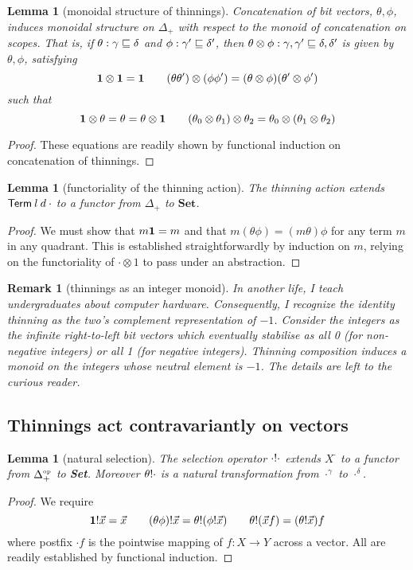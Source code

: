 \documentclass{jfp1}
\newtheorem{lemma}[theorem]{Lemma}
\newtheorem{remark}[theorem]{Remark}
\newcommand{\Set}{\textbf{Set}}
\newcommand{\op}[1]{#1^{\mbox{\tiny op}}}
\begin{document}
\begin{lemma}[monoidal structure of thinnings]
  Concatenation of bit vectors, $\theta,\phi$, induces monoidal
  structure on $\Delta_+$ with respect to the monoid of concatenation
  on scopes. That is, if $\theta:\gamma\sqsubseteq\delta$ and
  $\phi:\gamma'\sqsubseteq\delta'$, then $\theta\otimes\phi :
  \gamma,\gamma'\sqsubseteq\delta,\delta'$
  is given by $\theta,\phi$, satisfying
  \[
    \mathbf{1}\otimes\mathbf{1} = \mathbf{1} \qquad
    (\theta\theta')\otimes(\phi\phi') =
     (\theta\otimes\phi)(\theta'\otimes\phi')
   \]
   such that
   \[
     \mathbf{1}\otimes\theta = \theta = \theta\otimes\mathbf{1}\qquad
     (\theta_0\otimes\theta_1)\otimes\theta_2 = \theta_0\otimes(\theta_1\otimes\theta_2)
   \]
\end{lemma}
\begin{proof}
  These equations are readily shown by functional induction on
  concatenation of thinnings.
\end{proof}


\begin{lemma}[functoriality of the thinning action]
 The thinning action extends $\mathsf{Term}\:l\:d\:\cdot$ to a functor from $\Delta_+$ to $\Set$.
\end{lemma}
\begin{proof}
  We must show that $m\mathbf{1} = m$ and that $m(\theta\phi) = (m\theta)\phi$ for any term $m$ in any quadrant.
  This is established straightforwardly by induction on $m$, relying
  on the functoriality of
  $\cdot\otimes 1$ to pass under an abstraction.
\end{proof}

\begin{remark}[thinnings as an integer monoid]
  In another life, I teach undergraduates about computer hardware. Consequently, I recognize the identity thinning as the two's complement representation of $-1$.
  Consider the integers as the infinite right-to-left bit vectors which eventually stabilise as all 0 (for non-negative integers) or all 1 (for negative integers). Thinning composition induces a monoid on the integers whose neutral element is $-1$. The details are left to the curious reader.
\end{remark}

\subsection{Thinnings act contravariantly on vectors}

\begin{lemma}[natural selection]
  The selection operator $\cdot!\cdot$ extends $X^\cdot$
  to a functor from $\op{\Delta_+}$ to \Set.
  Moreover $\theta!\cdot$ is a natural transformation from
  $\cdot^\gamma$ to $\cdot^\delta$.
\end{lemma}
\begin{proof}
  We require
  \[
    \mathbf{1}!\vec x = \vec x \qquad
    (\theta\phi)!\vec x = \theta!(\phi!\vec x) \qquad
    \theta!(\vec x f) = (\theta!\vec x)f
  \]
  where postfix $\cdot f$ is the pointwise mapping of $f:X\to Y$ across a vector.
  All are readily established by functional induction.
\end{proof}
\end{document}

